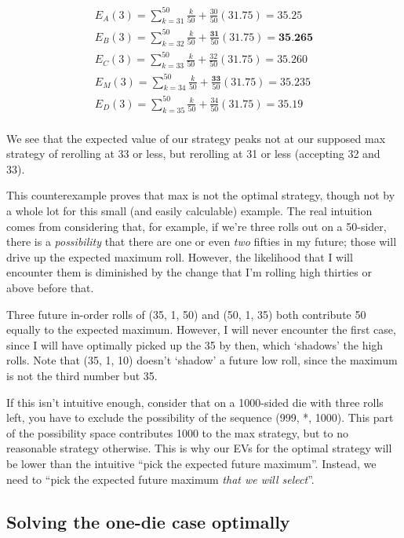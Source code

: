 \documentclass[11pt, oneside]{article} 	%
\begin{document}
\begin{align}
E_A(3) = \sum_{k=31}^{50} \frac{k}{50} + \frac{30}{50} (31.75) = 35.25 \\
E_B(3) = \sum_{k=32}^{50} \frac{k}{50} + \frac{\textbf{31}}{50} (31.75) = \textbf{35.265} \\
E_C(3) =  \sum_{k=33}^{50} \frac{k}{50} + \frac{32}{50} (31.75) = 35.260 \\
E_M(3) = \sum_{k=34}^{50} \frac{k}{50} + \frac{\textbf{33}}{50}(31.75) = 35.235 \\
E_D(3) = \sum_{k=35}^{50} \frac{k}{50} + \frac{34}{50} (31.75) = 35.19 \\
\end{align}

We see that the expected value of our strategy peaks not at our supposed max strategy of rerolling at 33 or less, but rerolling at 31 or less (accepting 32 and 33).

This counterexample proves that max is not the optimal strategy, though not by a whole lot for this small (and easily calculable) example.  The real intuition comes from considering that, for example, if we're three rolls out on a 50-sider, there is a \emph{possibility} that there are one or even \emph{two} fifties in my future; those will drive up the expected maximum roll.  However, the likelihood that I will encounter them is diminished by the change that I'm rolling high thirties or above before that. 

Three future in-order rolls of (35, 1, 50) and (50, 1, 35) both contribute 50 equally to the expected maximum.  However, I will never encounter the first case, since I will have optimally picked up the 35 by then, which `shadows' the high rolls.  Note that (35, 1, 10) doesn't `shadow' a future low roll, since the maximum is not the third number but 35.

If this isn't intuitive enough, consider that on a 1000-sided die with three rolls left, you have to exclude the possibility of the sequence (999, *, 1000).  This part of the possibility space contributes 1000 to the max strategy, but to no reasonable strategy otherwise.  This is why our EVs for the optimal strategy will be lower than the intuitive ``pick the expected future maximum''.  Instead, we need to ``pick the expected future maximum \emph{that we will select}''.

\subsection{Solving the one-die case optimally}
\end{document}
